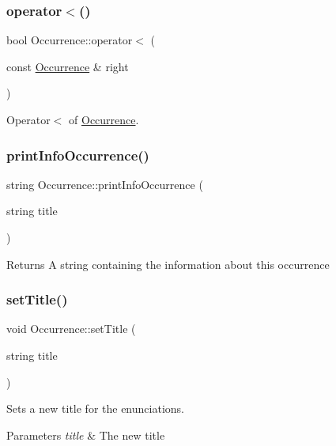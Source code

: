 \subsubsection{\texorpdfstring{operator$<$()}{operator<()}}
{\footnotesize\ttfamily bool Occurrence\+::operator$<$ (\begin{DoxyParamCaption}\item[{const \hyperlink{class_occurrence}{Occurrence} \&}]{right }\end{DoxyParamCaption})}



Operator$<$ of \hyperlink{class_occurrence}{Occurrence}. 

\mbox{\label{class_occurrence_abdd15553f837a9bc6979908afbb39787}} 
\subsubsection{\texorpdfstring{print\+Info\+Occurrence()}{printInfoOccurrence()}}
{\footnotesize\ttfamily string Occurrence\+::print\+Info\+Occurrence (\begin{DoxyParamCaption}\item[{string}]{title }\end{DoxyParamCaption})}

\begin{DoxyReturn}{Returns}
A string containing the information about this occurrence 
\end{DoxyReturn}
\mbox{\label{class_occurrence_a2e6912cc206246a4028756d49d0951fb}} 
\subsubsection{\texorpdfstring{set\+Title()}{setTitle()}}
{\footnotesize\ttfamily void Occurrence\+::set\+Title (\begin{DoxyParamCaption}\item[{string}]{title }\end{DoxyParamCaption})}



Sets a new title for the enunciations. 


\begin{DoxyParams}{Parameters}
{\em title} & The new title \\
\hline
\end{DoxyParams}
\mbox{\label{class_occurrence_a8073f785d9f29ad053fec276c5906531}} 
